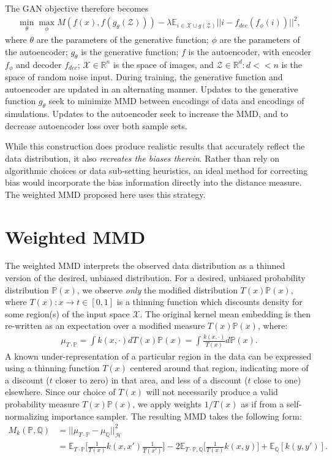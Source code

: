 \documentclass{article} %
\begin{document}
The GAN objective therefore becomes
\begin{align}
\min_{\theta} \max_{\phi} M (f(x), f(g_\theta(\mathcal{Z}))) - \lambda \mathbb{E}_{i \in \mathcal{X} \cup g(\mathcal{Z})} ||i - f_{dec}(f_\phi(i))||^2, 
\end{align}
where $\theta$ are the parameters of the generative function; $\phi$ are the parameters of the autoencoder; $g_\theta$ is the generative function; $f$ is the autoencoder, with encoder $f_\phi$ and decoder $f_{dec}$; $\mathcal{X} \in \mathbb{R}^n$ is the space of images, and $\mathcal{Z} \in \mathbb{R}^d: d << n$ is the space of random noise input. During training, the generative function and autoencoder are updated in an alternating manner. Updates to the generative function $g_\theta$ seek to minimize MMD between encodings of data and encodings of simulations. Updates to the autoencoder seek to increase the MMD, and to decrease autoencoder loss over both sample sets.

While this construction does produce realistic results that accurately reflect the data distribution, it also \textit{recreates the biases therein}. Rather than rely on algorithmic choices or data sub-setting heuristics, an ideal method for correcting bias would incorporate the bias information directly into the distance measure. The weighted MMD proposed here uses this strategy.

\section{Weighted MMD}

The weighted MMD interprets the observed data distribution as a thinned version of the desired, unbiased distribution. For a desired, unbiased probability distribution $\mathbb{P}(x)$, we observe \textit{only} the modified distribution $T(x)\mathbb{P}(x)$, where $T(x): x \rightarrow t \in [0, 1]$ is a thinning function which discounts density for some region(s) of the input space $\mathcal{X}$. The original kernel mean embedding is then re-written as an expectation over a modified measure $T(x)\mathbb{P}(x)$, where:
\begin{align}
\mu_{T \cdot \mathbb{P}} = \int k(x,\cdot)dT(x)\mathbb{P}(x) = \int \frac{k(x,\cdot)}{T(x)}d\mathbb{P}(x).
\end{align}
A known under-representation of a particular region in the data can be expressed using a thinning function $T(x)$ centered around that region, indicating more of a discount ($t$ closer to zero) in that area, and less of a discount ($t$ close to one) elsewhere. Since our choice of $T(x)$ will not necessarily produce a valid probability measure $T(x)\mathbb{P}(x)$, we apply weights $1/T(x)$ as if from a self-normalizing importance sampler. The resulting MMD takes the following form:
\begin{align}
M_k(\mathbb{P}, \mathbb{Q}) &= ||\mu_{T \cdot \mathbb{P}} - \mu_{\mathbb{Q}}||^2_\mathcal{H} \\
&= \mathbb{E}_{T \cdot \mathbb{P}}\Big[\frac{1}{T(x)} k(x,x') \frac{1}{T(x')}\Big] - 2 \mathbb{E}_{T\cdot\mathbb{P}, \mathbb{Q}}\Big[\frac{1}{T(x)}k(x,y)\Big] + \mathbb{E}_{\mathbb{Q}}[k(y,y')].
\end{align}
\end{document}
